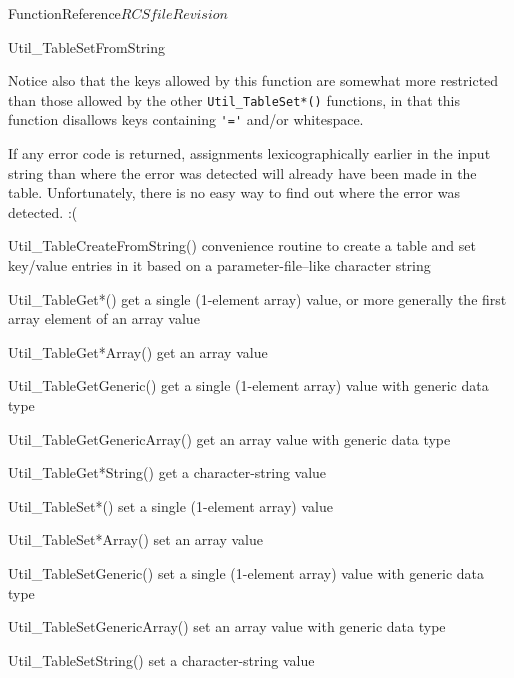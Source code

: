 \begin{cactuspart}{FunctionReference}{$RCSfile$}{$Revision$}
\begin{FunctionDescription}{Util\_TableSetFromString}
\begin{Discussion}
Notice also that the keys allowed by this function are somewhat more
restricted than those allowed by the other \verb|Util_TableSet*()|
functions, in that this function disallows keys containing \verb|'='|
and/or whitespace.

If any error code is returned, assignments lexicographically earlier
in the input string than where the error was detected will already
have been made in the table.  Unfortunately, there is no easy way to
find out where the error was detected. :(
\end{Discussion}

\begin{SeeAlsoSection}
\begin{SeeAlso}{Util\_TableCreateFromString()}
convenience routine to create a table and set key/value entries
in it based on a parameter-file--like character string
\end{SeeAlso}
\begin{SeeAlso}{Util\_TableGet*()}
get a single (1-element array) value,
or more generally the first array element of an array value
\end{SeeAlso}
\begin{SeeAlso}{Util\_TableGet*Array()}
get an array value
\end{SeeAlso}
\begin{SeeAlso}{Util\_TableGetGeneric()}
get a single (1-element array) value with generic data type
\end{SeeAlso}
\begin{SeeAlso}{Util\_TableGetGenericArray()}
get an array value with generic data type
\end{SeeAlso}
\begin{SeeAlso}{Util\_TableGet*String()}
get a character-string value
\end{SeeAlso}
\begin{SeeAlso}{Util\_TableSet*()}
set a single (1-element array) value
\end{SeeAlso}
\begin{SeeAlso}{Util\_TableSet*Array()}
set an array value
\end{SeeAlso}
\begin{SeeAlso}{Util\_TableSetGeneric()}
set a single (1-element array) value with generic data type
\end{SeeAlso}
\begin{SeeAlso}{Util\_TableSetGenericArray()}
set an array value with generic data type
\end{SeeAlso}
\begin{SeeAlso}{Util\_TableSetString()}
set a character-string value
\end{SeeAlso}
\end{SeeAlsoSection}


\end{FunctionDescription}
\end{cactuspart}
